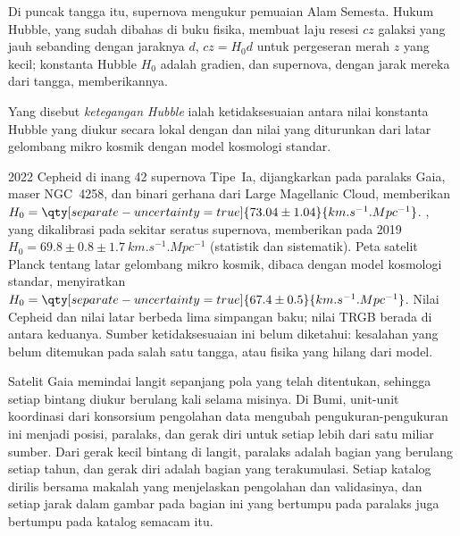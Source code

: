 Di puncak tangga itu, supernova mengukur pemuaian
Alam Semesta. Hukum Hubble, yang sudah dibahas di buku fisika, membuat laju
resesi $cz$ galaksi yang jauh sebanding dengan jaraknya $d$,
$cz = H_0 d$ untuk pergeseran merah $z$ yang kecil; konstanta Hubble $H_0$ adalah
gradien, dan supernova, dengan jarak mereka dari tangga, memberikannya.

\begin{definition}\label{def:b3:milky-way-galaxies:tension}
Yang disebut \emph{ketegangan Hubble} ialah ketidaksesuaian
antara nilai konstanta Hubble yang diukur secara lokal dengan
 dan nilai yang diturunkan dari latar gelombang mikro
kosmik dengan model kosmologi standar.
\end{definition}

\begin{dated}{2022}
Cepheid di inang 42 supernova Tipe~Ia, dijangkarkan pada
paralaks Gaia, maser NGC~4258, dan binari gerhana dari
Large Magellanic Cloud, memberikan
$H_0 = \qty[separate-uncertainty=true]{73.04 \pm 1.04}{km.s^{-1}.Mpc^{-1}}$.
, yang dikalibrasi pada sekitar seratus supernova,
memberikan pada 2019 $H_0 = 69.8 \pm 0.8 \pm \qty{1.7}{km.s^{-1}.Mpc^{-1}}$
(statistik dan sistematik). Peta satelit Planck tentang latar gelombang mikro
kosmik, dibaca dengan model kosmologi standar, menyiratkan
$H_0 = \qty[separate-uncertainty=true]{67.4 \pm 0.5}{km.s^{-1}.Mpc^{-1}}$.
Nilai Cepheid dan nilai latar berbeda lima
simpangan baku; nilai TRGB berada di antara keduanya. Sumber
ketidaksesuaian ini belum diketahui: kesalahan yang belum ditemukan pada salah satu
tangga, atau fisika yang hilang dari model.
\end{dated}

\begin{inthelab}
Satelit Gaia memindai langit sepanjang pola yang telah ditentukan, sehingga setiap
bintang diukur berulang kali selama misinya. Di Bumi, unit-unit koordinasi
dari konsorsium pengolahan data mengubah pengukuran-pengukuran ini
menjadi posisi, paralaks, dan gerak diri untuk setiap
lebih dari satu miliar sumber. Dari gerak kecil bintang di langit,
paralaks adalah bagian yang berulang setiap tahun, dan gerak diri
adalah bagian yang terakumulasi. Setiap katalog dirilis bersama makalah yang
menjelaskan pengolahan dan validasinya, dan setiap jarak dalam
gambar pada bagian ini yang bertumpu pada paralaks juga bertumpu pada
katalog semacam itu.
\end{inthelab}

